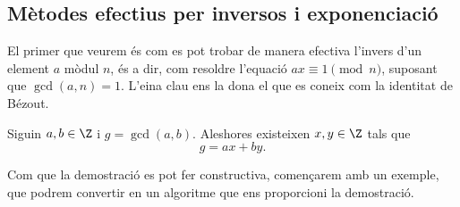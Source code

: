  \subsection{Mètodes efectius per inversos i exponenciació}
 El primer que veurem és com es pot trobar de manera efectiva l'invers d'un element $a$ mòdul $n$, és a dir, com resoldre l'equació $ax\equiv 1\pmod{n}$, suposant que $\gcd(a,n)=1$. L'eina clau ens la dona el que es coneix com la identitat de Bézout.
 
 \begin{proposition}
 \label{prop:xgcd}
  Siguin $a,b\in\Z$ i $g=\gcd(a,b)$. Aleshores existeixen $x,y\in\Z$ tals que
  \begin{equation}
  \label{prop:bezout}
  g=ax+by.
  \end{equation}
 \end{proposition}
 
 Com que la demostració es pot fer constructiva, començarem amb un exemple, que podrem convertir en un algoritme que ens proporcioni la demostració.
 
